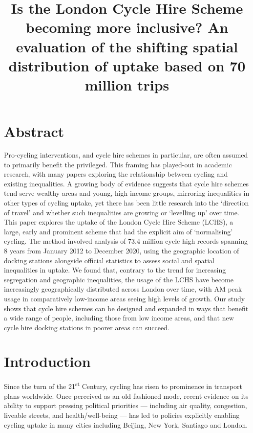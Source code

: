 \documentclass[]{article}
\title{Is the London Cycle Hire Scheme becoming more inclusive? An evaluation of the shifting spatial distribution of uptake based on 70 million trips}
\author{}
\date{\vspace{-2.5em}}
\begin{document}
\maketitle

{
\setcounter{tocdepth}{2}
\tableofcontents
}
\hypertarget{abstract}{%
\section*{Abstract}\label{abstract}}

Pro-cycling interventions, and cycle hire schemes in particular, are often assumed to primarily benefit the privileged.
This framing has played-out in academic research, with many papers exploring the relationship between cycling and existing inequalities.
A growing body of evidence suggests that cycle hire schemes tend serve wealthy areas and young, high income groups, mirroring inequalities in other types of cycling uptake, yet there has been little research into the `direction of travel' and whether such inequalities are growing or `levelling up' over time.
This paper explores the uptake of the London Cycle Hire Scheme (LCHS), a large, early and prominent scheme that had the explicit aim of `normalising' cycling.
The method involved analysis of 73.4 million cycle high records spanning 8 years from January 2012 to December 2020, using the geographic location of docking stations alongside official statistics to assess social and spatial inequalities in uptake.
We found that, contrary to the trend for increasing segregation and geographic inequalities, the usage of the LCHS have become increasingly geographically distributed across London over time, with AM peak usage in comparatively low-income areas seeing high levels of growth.
Our study shows that cycle hire schemes can be designed and expanded in ways that benefit a wide range of people, including those from low income areas, and that new cycle hire docking stations in poorer areas can succeed.

\hypertarget{introduction}{%
\section{Introduction}\label{introduction}}

Since the turn of the 21\textsuperscript{st} Century, cycling has risen to prominence in transport plans worldwide.
Once perceived as an old fashioned mode, recent evidence on its ability to support pressing political priorities --- including air quality, congestion, liveable streets, and health/well-being --- has led to policies explicitly enabling cycling uptake in many cities including Beijing, New York, Santiago and London.
\end{document}
